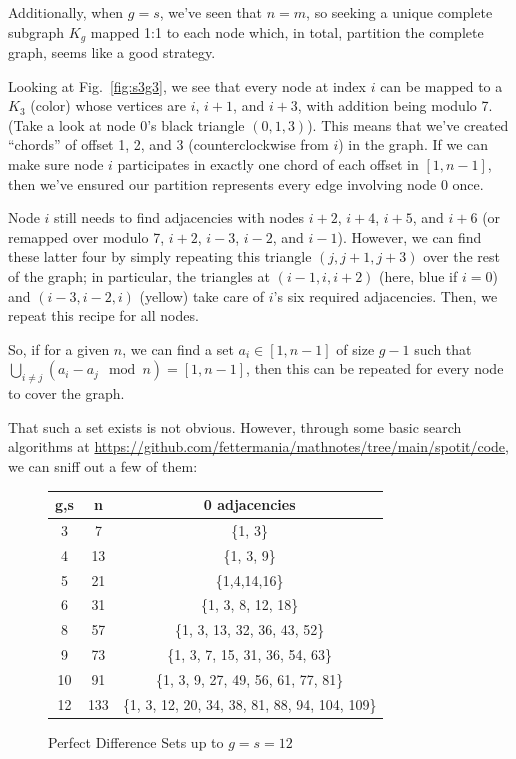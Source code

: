 \documentclass[11pt, oneside]{article} 	%
\begin{document}
Additionally, when $g=s$, we've seen that $n = m$, so seeking a unique complete subgraph $K_g$ mapped 1:1 to each node which, in total, partition the complete graph, seems like a good strategy.

Looking at Fig.~\ref{fig:s3g3}, we see that every node at index $i$ can be mapped to a $K_3$ (color) whose vertices are $i$, $i+1$, and $i+3$, with addition being modulo 7. (Take a look at node 0's black triangle $(0, 1, 3)$). This means that we've created ``chords'' of offset 1, 2, and 3 (counterclockwise from $i$) in the graph. If we can make sure node $i$ participates in exactly one chord of each offset in $[1,n-1]$, then we've ensured our partition represents every edge involving node 0 once. 

Node $i$ still needs to find adjacencies with nodes $i+2$, $i+4$, $i+5$, and $i+6$ (or remapped over modulo 7, $i+2$, $i-3$, $i-2$, and $i-1$). However, we can find these latter four by simply repeating this triangle $(j, j+1, j+3)$ over the rest of the graph; in particular, the triangles at $(i-1, i, i+2)$ (here, blue if $i=0$) and $(i-3, i-2, i)$ (yellow) take care of $i$'s six required adjacencies. Then, we repeat this recipe for all nodes.

So, if for a given $n$, we can find a set $a_i \in [1,n-1]$ of size $g-1$ such that $\bigcup_{i \neq j} (a_i - a_j \mod n) = [1, n-1]$, then this can be repeated for every node to cover the graph.

That such a set exists is not obvious. However, through some basic search algorithms at \url{https://github.com/fettermania/mathnotes/tree/main/spotit/code}, we can sniff out a few of them:

\begin{figure}[!htb]
 \begin{tabular}{c c | c }
 g,s & n & 0 adjacencies \\
\hline
 3 & 7 & \{1, 3\} \\
 4 & 13 & \{1, 3, 9\} \\
 5 & 21 & \{1,4,14,16\} \\
 6 & 31 & \{1, 3, 8, 12, 18\} \\
 8 & 57 & \{1, 3, 13, 32, 36, 43, 52\} \\
 9 & 73 & \{1, 3, 7, 15, 31, 36, 54, 63\} \\
 10 & 91 & \{1, 3, 9, 27, 49, 56, 61, 77, 81\} \\
 12 & 133 & \{1, 3, 12, 20, 34, 38, 81, 88, 94, 104, 109\} \\
 \end{tabular}
 \caption{Perfect Difference Sets up to $g=s=12$}
\label{fig:perfect-diffs}
\end{figure}
\end{document}

